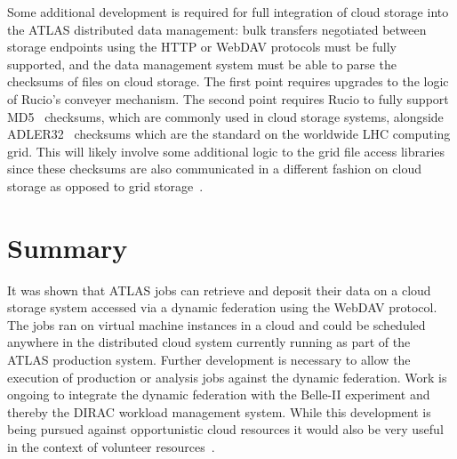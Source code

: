 \documentclass[a4paper]{jpconf}
\begin{document}
Some additional development is required for full integration of cloud storage into the ATLAS distributed data management: bulk transfers negotiated between storage endpoints using the HTTP or WebDAV protocols must be fully supported, and the data management system must be able to parse the checksums of files on cloud storage. The first point requires upgrades to the logic of Rucio's conveyer mechanism. The second point requires Rucio to fully support MD5~\cite{md5} checksums, which are commonly used in cloud storage systems, alongside ADLER32~\cite{adler32} checksums which are the standard on the worldwide LHC computing grid. This will likely involve some additional logic to the grid file access libraries since these checksums are also communicated in a different fashion on cloud storage as opposed to grid storage~\cite{content-md5, request-digest}.

\section{Summary}
It was shown that ATLAS jobs can retrieve and deposit their data on a cloud storage system accessed via a dynamic federation using the WebDAV protocol. The jobs ran on virtual machine instances in a cloud and could be scheduled anywhere in the distributed cloud system currently running as part of the ATLAS production system. Further development is necessary to allow the execution of production or analysis jobs against the dynamic federation. Work is ongoing to integrate the dynamic federation with the Belle-II experiment and thereby the DIRAC workload management system. While this development is being pursued against opportunistic cloud resources it would also be very useful in the context of volunteer resources~\cite{boinc}.
\end{document}
